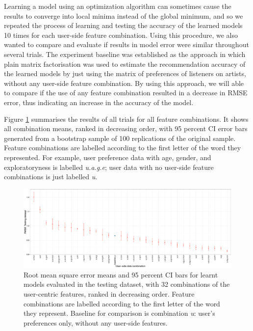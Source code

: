 Learning a model using an optimization algorithm can sometimes cause the results to converge into local minima instead of the global minimum,  and so we repeated the process of learning and testing the accuracy of the learned models  10 times for each user-side feature combination.  Using this procedure, we also wanted to compare and evaluate if results in model error were similar throughout several trials.
The experiment baseline was established as the approach in which plain matrix factorisation was used to estimate the recommendation accuracy of the learned models by just using the matrix of preferences of listeners on artists, without any user-side  feature combination. By using this approach, we will able to compare if the use of any feature combination resulted in a decrease in RMSE error, thus indicating an increase in the accuracy of the model.

Figure \ref{fig:4_feature_comparison_results} summarises the results of all trials for all feature combinations. It shows all combination means, ranked in decreasing order, with 95 percent CI error bars generated from a bootstrap sample of 100 replications of the original sample. 
Feature combinations are labelled according to the first letter of the word they represented. For example, user preference data with age, gender, and exploratoryness is labelled \emph{u.a.g.e}; user data with no user-side feature combinations is just labelled \emph{u}.


\begin{figure}
    \centering
  \includegraphics[width=1.0\linewidth]{figs/ch8/32_features_1e-06_100_factors_ci__n_5_bootstrap_100_publication_cropped-2_to_crop_cropped.pdf}
  \caption[Root mean square error means for learnt models with 32 combinations of user-centric features, ranked in decreasing order]{Root mean square error means and 95 percent CI bars for learnt models evaluated in the testing dataset, with 32 combinations of the user-centric features, ranked in decreasing order. Feature combinations are labelled according to the first letter of the word they represent. Baseline for comparison is combination \emph{u}: user's preferences only, without any user-side features. }
  \label{fig:4_feature_comparison_results}
\end{figure}





